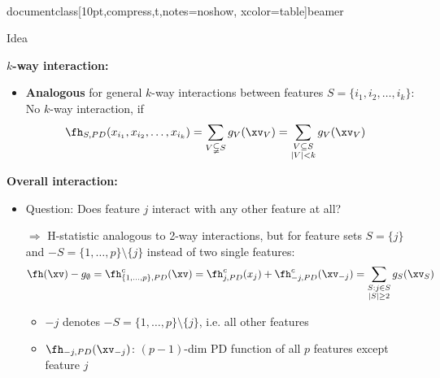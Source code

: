 \\documentclass[10pt,compress,t,notes=noshow, xcolor=table]{beamer}
\begin{document}
\begin{frame}{Idea %
}

\textbf{$k$-way interaction:}
\begin{itemize}
    \item \textbf{Analogous} for general $k$-way interactions between features $S = \{ i_1, i_2, \dots, i_k \}$: No $k$-way interaction, if
    \begin{align*}
        &\fh_{S, PD}( x_{i_1}, x_{i_2}, \dots, x_{i_k} )
        = \sum_{V \subsetneqq S} g_{V}(\xv_V)
        = \sum_{\substack{V \subseteq S \\ |V|<k}} g_{V}(\xv_V)
    \end{align*}
\end{itemize}
\pause
\textbf{Overall interaction:}
\begin{itemize}
    \item Question: Does feature $j$ interact with any other feature at all?
    \item[$\Rightarrow$] H-statistic analogous to 2-way interactions, but for feature sets $S = \{j\}$ and $-S = \{1, \dots, p\}\setminus \{j\}$ instead of two single features: \\
    \pause
    $$
    \fh(\xv) - g_\emptyset
    = \fh^c_{\{1, \dots, p\}, PD}(\xv)
    = \fh^c_{j, PD}(x_j) +  \fh^c_{-j, PD}(\xv_{-j})
    = \sum_{\substack{S: j \in S \\ \mid S \mid \geq 2}} g_S(\xv_S)
    $$
    \begin{itemize}
        \item $-j$ denotes $-S = \{1, \dots, p\}\setminus \{j\}$, i.e. all other features
    	\item $\fh_{-j, PD}(\xv_{-j})$: $(p-1)$-dim PD function of all $p$ features except feature $j$
    \end{itemize}
\end{itemize}
    
\end{frame}
\end{document}
